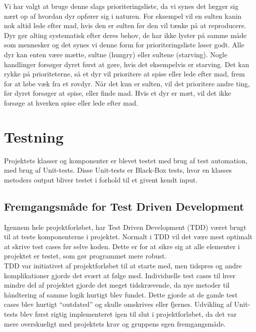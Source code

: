 \documentclass[12pt]{article}
\begin{document}
Vi har valgt at bruge denne slags prioriteringsliste, da vi synes det lægger sig nært op af hvordan dyr opfører sig i naturen. For eksempel vil en sulten kanin nok altid lede efter mad, hvis den er sulten før den vil tænke på at reproducere. Dyr gør alting systematisk efter deres behov, de har ikke lyster på samme måde som mennesker og det synes vi denne form for prioriteringsliste løser godt.
Alle dyr kan enten være mætte, sultne (hungry) eller sultene (starving). Nogle handlinger forsøger dyret først at gøre, hvis det eksempelvis er starving. Det kan rykke på prioriteterne, så et dyr vil prioritere at spise eller lede efter mad, frem for at løbe væk fra et rovdyr. Når det kun er sulten, vil det prioritere andre ting, før dyret forsøger at spise, eller finde mad. Hvis et dyr er mæt, vil det ikke forsøge at hverken spise eller lede efter mad.
 \newpage  
\section{Testning}
    Projektets klasser og komponenter er blevet testet med brug af test automation, med brug af Unit-tests. Disse Unit-tests er Black-Box tests, hvor en klasses metoders output bliver testet i forhold til et givent kendt input. 
    \subsection{Fremgangsmåde for Test Driven Development}
    Igennem hele projektforløbet, har Test Driven Development (TDD) været brugt til at teste komponenterne i projektet. Normalt i TDD vil det være mest optimalt at skrive test cases før selve koden. Dette er for at sikre sig at alle elementer i projektet er testet, som gør programmet mere robust. 
    \\TDD var initiativet af projektforløbet til at starte med, men tidspres og andre komplikationer gjorde det svært at følge med. Individuelle test cases til hver mindre del af projektet gjorde det meget tidskrævende, da nye metoder til håndtering af samme logik hurtigt blev fundet. Dette gjorde at de gamle test cases blev hurtigt “outdated” og skulle omskrives eller fjernes. Udvikling af Unit-tests blev først rigtig implementeret igen til slut i projektforløbet, da det var mere overskueligt med projektets krav og gruppens egen fremgangsmåde.
\end{document}
